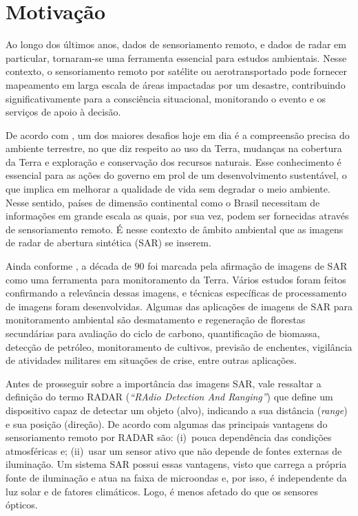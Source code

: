  

\section{Motivação}

Ao longo dos últimos anos, dados de sensoriamento remoto, e dados de radar em particular, tornaram-se uma ferramenta essencial para estudos ambientais. 
Nesse contexto, o sensoriamento remoto por satélite ou aerotransportado pode fornecer mapeamento em larga escala de áreas impactadas por um desastre, contribuindo significativamente para a consciência situacional, monitorando o evento e os serviços de apoio à decisão. 

De acordo com \citet{Frery99}, um dos maiores desafios hoje em dia é a compreensão precisa do ambiente terrestre, no que diz respeito ao uso da Terra, mudanças na cobertura da Terra e exploração e conservação dos recursos naturais. Esse conhecimento é essencial para as ações do governo em prol de um desenvolvimento sustentável, o que implica em melhorar a qualidade de vida sem degradar o meio ambiente. 
Nesse sentido, países de dimensão continental como o Brasil necessitam de informações em grande escala as quais, por sua vez, podem ser fornecidas através de sensoriamento remoto. 
É nesse contexto de âmbito ambiental que as imagens de radar de abertura sintética (SAR) se inserem.

Ainda conforme \citet{Freitas2005}, a década de $90$ foi marcada pela afirmação de imagens de SAR como uma ferramenta para monitoramento da Terra. 
Vários estudos foram feitos confirmando a relevância dessas imagens, e técnicas específicas de processamento de imagens foram desenvolvidas. 
Algumas das aplicações de imagens de SAR para monitoramento ambiental são desmatamento e regeneração de florestas secundárias para avaliação do ciclo de carbono, quantificação de biomassa, detecção de petróleo, monitoramento de cultivos, previsão de enchentes, vigilância de atividades militares em situações de crise, entre outras aplicações.

Antes de prosseguir sobre a importância das imagens SAR, vale ressaltar a definição do termo RADAR (\textit{``RAdio Detection And Ranging''}) que define um dispositivo capaz de detectar um objeto (alvo), indicando a sua distância (\textit{range}) e sua posição (direção). 
De acordo com \citet{Pottier2009} algumas das principais vantagens do sensoriamento remoto por RADAR são: 
(i)~pouca dependência das condições atmosféricas e; 
(ii)~usar um sensor ativo que não depende de fontes externas de iluminação. 
Um sistema SAR possui essas vantagens, visto que carrega a própria fonte de iluminação e atua na faixa de microondas e, por isso, é independente da luz solar e de fatores climáticos. 
Logo, é menos afetado do que os sensores ópticos. 

